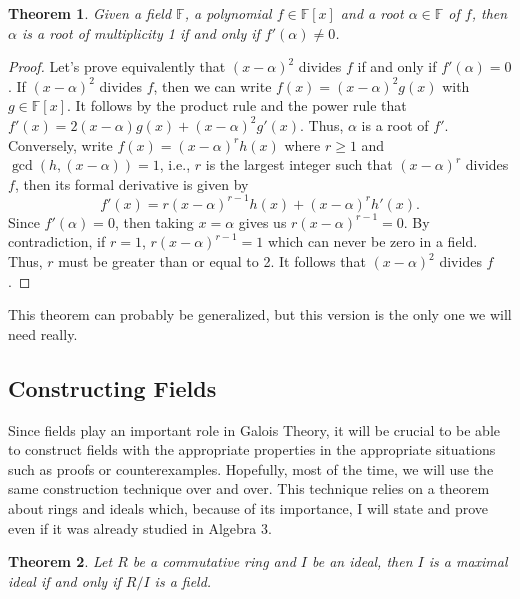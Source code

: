 \documentclass{article}
\theoremstyle{plain}
\newtheorem{theorem}{Theorem}[subsection]
\theoremstyle{definition}
\newcommand{\F}{\mathbb{F}}
\begin{document}
\begin{theorem}
\label{formal derivatives and multiple roots}
    Given a field $\F$, a polynomial $f \in \F[x]$ and a root $\alpha \in \F$ of $f$, then $\alpha$ is a root of multiplicity 1 if and only if $f'(\alpha) \neq 0$. 
\end{theorem}

\begin{proof}
    Let's prove equivalently that $(x - \alpha)^2$ divides $f$ if and only if $f'(\alpha) = 0$. If $(x - \alpha)^2$ divides $f$, then we can write $f(x) = (x - \alpha)^2g(x)$ with $g \in \F[x]$. It follows by the product rule and the power rule that $f'(x) = 2(x - \alpha)g(x) + (x - \alpha)^2 g'(x)$. Thus, $\alpha$ is a root of $f'$. Conversely, write $f(x) = (x - \alpha)^r h(x)$ where $r \geq 1$ and $\gcd(h, (x-\alpha)) = 1$, i.e., $r$ is the largest integer such that $(x - \alpha)^r$ divides $f$, then its formal derivative is given by
    $$f'(x) = r(x - \alpha)^{r-1}h(x) + (x - \alpha)^r h'(x).$$
    Since $f'(\alpha) = 0$, then taking $x = \alpha$ gives us $r(x - \alpha)^{r-1} = 0$. By contradiction, if $r = 1$, $r(x - \alpha)^{r-1} = 1$ which can never be zero in a field. Thus, $r$ must be greater than or equal to 2. It follows that $(x - \alpha)^2$ divides $f$. 
\end{proof}

This theorem can probably be generalized, but this version is the only one we will need really.

\subsection{Constructing Fields}

Since fields play an important role in Galois Theory, it will be crucial to be able to construct fields with the appropriate properties in the appropriate situations such as proofs or counterexamples. Hopefully, most of the time, we will use the same construction technique over and over. This technique relies on a theorem about rings and ideals which, because of its importance, I will state and prove even if it was already studied in Algebra 3.

\begin{theorem}
\label{Ring field}
    Let $R$ be a commutative ring and $I$ be an ideal, then $I$ is a maximal ideal if and only if $R/I$ is a field.
\end{theorem}
\end{document}
